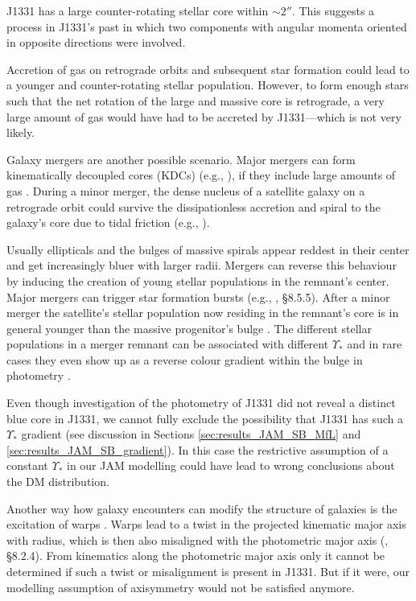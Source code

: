 \documentclass[useAMS,usenatbib]{mnras}
\begin{document}
J1331 has a large counter-rotating stellar core within $\sim 2''$. This suggests a process in J1331's past in which two components with angular momenta oriented in opposite directions were involved.

Accretion of gas on retrograde orbits and subsequent star formation could lead to a younger and counter-rotating stellar population. However, to form enough stars such that the net rotation of the large and massive core is retrograde, a very large amount of gas would have had to be accreted by J1331---which is not very likely. 

Galaxy mergers are another possible scenario. Major mergers can form kinematically decoupled cores (KDCs) (e.g., \citealt{2011MNRAS.414.2923K,2015ApJ...802L...3T}), if they include large amounts of gas \citep{2010ApJ...723..818H}. During a minor merger, the dense nucleus of a satellite galaxy on a retrograde orbit could survive the dissipationless accretion and spiral to the galaxy's core due to tidal friction (e.g., \citealt{1984ApJ...287..577K,1988ApJ...327L..55F}). 

Usually ellipticals and the bulges of massive spirals appear reddest in their center and get increasingly bluer with larger radii. Mergers can reverse this behaviour by inducing the creation of young stellar populations in the remnant's center. Major mergers can trigger star formation bursts (e.g., \citealt{2008gady.book.....B}, \S 8.5.5). After a minor merger the satellite's stellar population now residing in the remnant's core is in general younger than the massive progenitor's bulge \citep{1996AJ....112..839C,2010MNRAS.404.1775T}. The different stellar populations in a merger remnant can be associated with different $\Upsilon_*$ and in rare cases they even show up as a reverse colour gradient within the bulge in photometry \citep{1990ApJ...361..381B, 1997ApJ...481..710C}.

Even though investigation of the photometry of J1331 did not reveal a distinct blue core in J1331, we cannot fully exclude the possibility that J1331 has such a $\Upsilon_*$ gradient (see discussion in Sections \ref{sec:results_JAM_SB_MfL} and \ref{sec:results_JAM_SB_gradient}). In this case the restrictive assumption of a constant $\Upsilon_*$ in our JAM modelling could have lead to wrong conclusions about the DM distribution.

Another way how galaxy encounters can modify the structure of galaxies is the excitation of warps \citep{1991wdir.book.....C,2013pss5.book..923S}. Warps lead to a twist in the projected kinematic major axis with radius, which is then also misaligned with the photometric major axis (\citealt{1998gaas.book.....B}, \S 8.2.4). From kinematics along the photometric major axis only it cannot be determined if such a twist or misalignment is present in J1331. But if it were, our modelling assumption of axisymmetry would not be satisfied anymore. 
\end{document}
